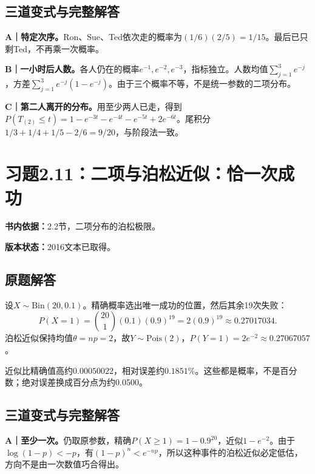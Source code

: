 \documentclass[
  11pt,
  a4paper,
  UTF8,fontset=fandol]{ctexart}
\let\OldSection\section
\renewcommand{\section}{\Needspace{7\baselineskip}\OldSection}
\let\OldSubsection\subsection
\renewcommand{\subsection}{\Needspace{5\baselineskip}\OldSubsection}
\begin{document}
\subsection{三道变式与完整解答}\label{ux4e09ux9053ux53d8ux5f0fux4e0eux5b8cux6574ux89e3ux7b54-9}

\textbf{A｜特定次序。}Ron、Sue、Ted依次走的概率为\((1/6)(2/5)=1/15\)。最后已只剩Ted，不再乘一次概率。

\textbf{B｜一小时后人数。}各人仍在的概率\(e^{-1},e^{-2},e^{-3}\)，指标独立。人数均值\(\sum_{j=1}^3e^{-j}\)，方差\(\sum_{j=1}^3e^{-j}(1-e^{-j})\)。由于三个概率不等，不是统一参数的二项分布。

\textbf{C｜第二人离开的分布。}用至少两人已走，得到\(P(T_{(2)}\le t)=1-e^{-3t}-e^{-4t}-e^{-5t}+2e^{-6t}\)。尾积分\(1/3+1/4+1/5-2/6=9/20\)，与阶段法一致。

\newpage

\section{习题2.11：二项与泊松近似：恰一次成功}\label{ux4e60ux98982.11ux4e8cux9879ux4e0eux6ccaux677eux8fd1ux4f3cux6070ux4e00ux6b21ux6210ux529f}

\textbf{书内依据：}2.2节，二项分布的泊松极限。

\textbf{版本状态：}2016文本已取得。

\subsection{原题解答}\label{ux539fux9898ux89e3ux7b54-10}

设\(X\sim\mathrm{Bin}(20,0.1)\)。精确概率选出唯一成功的位置，然后其余19次失败：
\[P(X=1)=\binom{20}1(0.1)(0.9)^{19}=2(0.9)^{19}\approx0.27017034.\]
泊松近似保持均值\(\theta=np=2\)，故\(Y\sim\mathrm{Pois}(2)\)，\(P(Y=1)=2e^{-2}\approx0.27067057\)。

近似比精确值高约\(0.00050022\)，相对误差约\(0.1851\%\)。这些都是概率，不是百分数；绝对误差换成百分点为约0.0500。

\subsection{三道变式与完整解答}\label{ux4e09ux9053ux53d8ux5f0fux4e0eux5b8cux6574ux89e3ux7b54-10}

\textbf{A｜至少一次。}仍取原参数，精确\(P(X\ge1)=1-0.9^{20}\)，近似\(1-e^{-2}\)。由于\(\log(1-p)<-p\)，有\((1-p)^n<e^{-np}\)，所以这种事件的泊松近似必定低估，方向不是由一次数值巧合得出。
\end{document}
